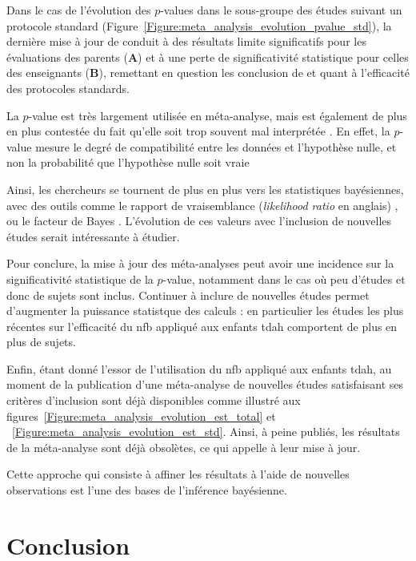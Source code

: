Dans le cas de l'évolution des $p$-values dans le sous-groupe des études suivant un protocole standard (Figure~\ref{Figure:meta_analysis_evolution_pvalue_std}), la dernière mise à jour 
de \citet{Cortese2016} conduit à des résultats limite significatifs pour les évaluations des parents (\textbf{A}) et à une perte de significativité statistique pour celles des 
enseignants (\textbf{B}), remettant en question les conclusion de \citet{Cortese2016} et \citet{Bussalb2019clinical} quant à l'efficacité des protocoles standards.
 
La $p$-value est très largement utilisée en méta-analyse, mais est également de plus en plus contestée du fait qu'elle soit trop souvent mal interprétée 
\citep{Halsey2019}. 
En effet, la $p$-value mesure le degré de compatibilité entre les données et l'hypothèse nulle, et non la probabilité que l'hypothèse nulle soit vraie

Ainsi, les chercheurs se tournent de plus en plus vers les statistiques bayésiennes, avec des outils comme le rapport de vraisemblance 
(\textit{likelihood ratio} en anglais) \citep{Dormuth2016}, ou le facteur de Bayes \citep{Morey2016, Rouder2011}. L'évolution de ces 
valeurs avec l'inclusion de nouvelles études serait intéressante à étudier. 

Pour conclure, la mise à jour des méta-analyses peut avoir une incidence sur la significativité statistique de la $p$-value, notamment dans le cas où peu d'études et donc de sujets
sont inclus. Continuer à inclure de nouvelles études permet d'augmenter la puissance statistque des calculs : en particulier les études les plus récentes sur l'efficacité du \gls{nfb}
appliqué aux enfants \gls{tdah} comportent de plus en plus de sujets.

Enfin, étant donné l'essor de l'utilisation du \gls{nfb} appliqué aux enfants \gls{tdah}, au moment de la publication d'une méta-analyse de nouvelles études satisfaisant ses critères d'inclusion
sont déjà disponibles comme illustré aux figures~\ref{Figure:meta_analysis_evolution_est_total} et ~\ref{Figure:meta_analysis_evolution_est_std}. Ainsi, à peine publiés, les résultats de la 
méta-analyse sont déjà obsolètes, ce qui appelle à leur mise à jour. 

Cette approche qui consiste à affiner les résultats à l'aide de nouvelles observations est l'une des bases de l'inférence bayésienne.

\section{Conclusion}

